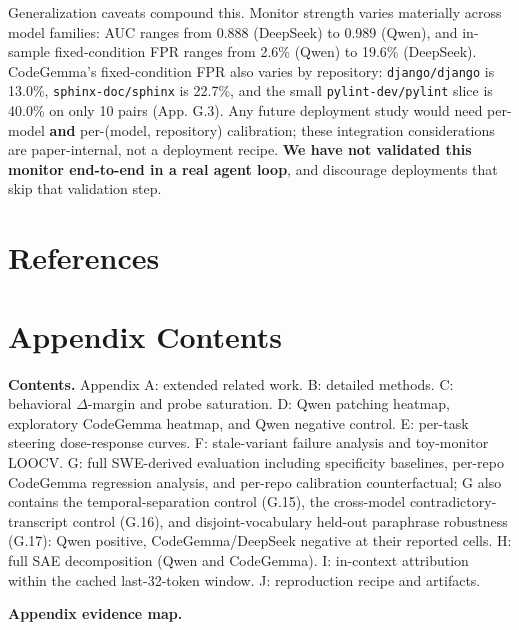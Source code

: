 \documentclass[
  11pt,
  a4paper]{article}
\begin{document}
Generalization caveats compound this. Monitor strength varies materially
across model families: AUC ranges from 0.888 (DeepSeek) to 0.989 (Qwen),
and in-sample fixed-condition FPR ranges from 2.6\% (Qwen) to 19.6\%
(DeepSeek). CodeGemma's fixed-condition FPR also varies by repository:
\texttt{django/django} is 13.0\%, \texttt{sphinx-doc/sphinx} is 22.7\%,
and the small \texttt{pylint-dev/pylint} slice is 40.0\% on only 10
pairs (App. G.3). Any future deployment study would need per-model
\textbf{and} per-(model, repository) calibration; these integration
considerations are paper-internal, not a deployment recipe. \textbf{We
have not validated this monitor end-to-end in a real agent loop}, and
discourage deployments that skip that validation step.

\section{References}\label{references}



\appendix

\section*{Appendix Contents}\label{appendix-contents}

\textbf{Contents.} Appendix A: extended related work. B: detailed
methods. C: behavioral \ensuremath{\Delta}-margin and probe saturation. D: Qwen patching
heatmap, exploratory CodeGemma heatmap, and Qwen negative control. E:
per-task steering dose-response curves. F: stale-variant failure
analysis and toy-monitor LOOCV. G: full SWE-derived evaluation including
specificity baselines, per-repo CodeGemma regression analysis, and
per-repo calibration counterfactual; G also contains the
temporal-separation control (G.15), the cross-model
contradictory-transcript control (G.16), and disjoint-vocabulary
held-out paraphrase robustness (G.17): Qwen positive, CodeGemma/DeepSeek
negative at their reported cells. H: full SAE decomposition (Qwen and
CodeGemma). I: in-context attribution within the cached last-32-token
window. J: reproduction recipe and artifacts.

\textbf{Appendix evidence map.}
\end{document}
